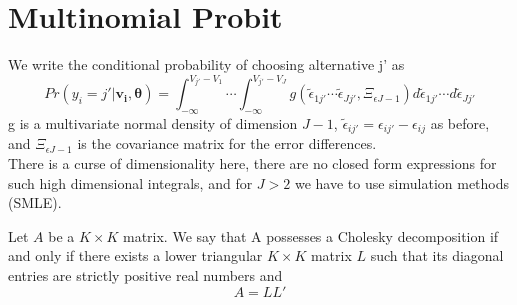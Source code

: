 \documentclass[DIV=14,titlepage=false]{scrreprt}
\begin{document}
\section{Multinomial Probit}
We write the conditional probability of choosing alternative j' as 
\[
    Pr(y_i = j'|\mathbf{v_i,\theta}) = \int_{-\infty}^{V_{j'}-V_1} \cdots \int_{-\infty}^{V_{j'}-V_{J}} g(\tilde \epsilon_{1j'} \cdots \tilde \epsilon_{Jj'}, \Xi_{\epsilon J-1}) d\tilde \epsilon_{1j'} \cdots d\tilde \epsilon_{Jj'}
\]
g is a multivariate normal density of dimension $J-1$, $\tilde \epsilon_{ij'} = \epsilon_{ij'} - \epsilon_{ij}$ as before, and $\Xi_{\epsilon J-1}$ is the covariance matrix for the error differences.\\
There is a curse of dimensionality here, there are no closed form expressions for such high dimensional integrals, and for $J>2$  we have to use simulation methods (SMLE).
\begin{lemma}
Let $A$ be a $K \times K$ matrix. We say that A possesses a Cholesky decomposition if and only if there exists a lower triangular $K \times K$ matrix $L$ such that its diagonal entries are strictly positive real numbers and
\[
    A = LL'
\]
\end{lemma}
\end{document}
